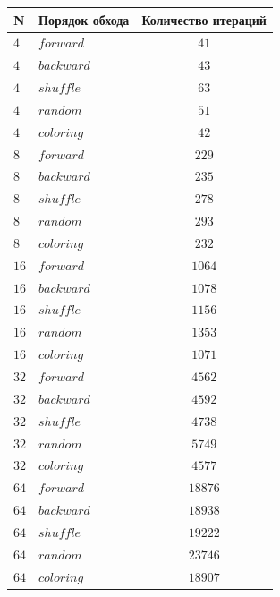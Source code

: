 	\noindent %
	\begin{minipage}{\textwidth}
		\vspace{\mfloatsep} %
		\centering\small
		\label{tab:order-experiment}
		\begin{tabular}{|l|l|c|}
			\hline
			\textbf{N} & \textbf{Порядок обхода} & \textbf{Количество итераций} \\
			\hline
			$4$ & $forward$ & $41$  \\ \hline
			$4$ & $backward$ & $43$ \\ \hline
			$4$ & $shuffle$ & $63$  \\ \hline
			$4$ & $random$ & $51$   \\ \hline
			$4$ & $coloring$ & $42$ \\ \hline
			$8$ & $forward$ & $229$  \\ \hline
			$8$ & $backward$ & $235$ \\ \hline
			$8$ & $shuffle$ & $278$  \\ \hline
			$8$ & $random$ & $293$   \\ \hline
			$8$ & $coloring$ & $232$ \\ \hline
			$16$ & $forward$ & $1064$  \\ \hline
			$16$ & $backward$ & $1078$ \\ \hline
			$16$ & $shuffle$ & $1156$  \\ \hline
			$16$ & $random$ & $1353$   \\ \hline
			$16$ & $coloring$ & $1071$ \\ \hline
			$32$ & $forward$ & $4562$  \\ \hline
			$32$ & $backward$ & $4592$ \\ \hline
			$32$ & $shuffle$ & $4738$  \\ \hline
			$32$ & $random$ & $5749$   \\ \hline
			$32$ & $coloring$ & $4577$ \\ \hline
			$64$ & $forward$ & $18876$  \\ \hline
			$64$ & $backward$ & $18938$ \\ \hline
			$64$ & $shuffle$ & $19222$  \\ \hline
			$64$ & $random$ & $23746$   \\ \hline
			$64$ & $coloring$ & $18907$ \\ \hline	
		\end{tabular}
		\vspace{\mfloatsep} %
		\normalsize %
	\end{minipage}
	
